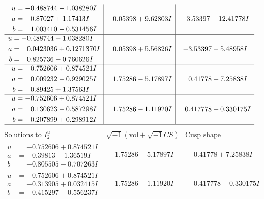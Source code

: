 \documentclass[1p]{elsarticle_modified}
\theoremstyle{definition}
\newcommand{\I}{\sqrt{-1}}
\begin{document}
$$\begin{array}{c|c|c}
\begin{aligned}
u &= -0.488744 - 1.038280 I \\
a &= \phantom{-}0.87027 + 1.17413 I \\
b &= \phantom{-}1.003410 - 0.531456 I\end{aligned}
 & \phantom{-}0.05398 + 9.62803 I & -3.53397 - 12.41778 I \\ \hline\begin{aligned}
u &= -0.488744 - 1.038280 I \\
a &= \phantom{-}0.0423036 + 0.1271370 I \\
b &= \phantom{-}0.825736 - 0.760626 I\end{aligned}
 & \phantom{-}0.05398 + 5.56826 I & -3.53397 - 5.48958 I \\ \hline\begin{aligned}
u &= -0.752606 + 0.874521 I \\
a &= \phantom{-}0.009232 - 0.929025 I \\
b &= \phantom{-}0.89425 + 1.37563 I\end{aligned}
 & \phantom{-}1.75286 - 5.17897 I & \phantom{-}0.41778 + 7.25838 I \\ \hline\begin{aligned}
u &= -0.752606 + 0.874521 I \\
a &= \phantom{-}0.130623 - 0.587298 I \\
b &= -0.207899 + 0.298912 I\end{aligned}
 & \phantom{-}1.75286 - 1.11920 I & \phantom{-}0.417778 + 0.330175 I\\
 \hline 
 \end{array}$$\newpage$$\begin{array}{c|c|c}  
\text{Solutions to }I^u_{2}& \I (\text{vol} + \sqrt{-1}CS) & \text{Cusp shape}\\
 \hline 
\begin{aligned}
u &= -0.752606 + 0.874521 I \\
a &= -0.39813 + 1.36519 I \\
b &= -0.805505 - 0.707263 I\end{aligned}
 & \phantom{-}1.75286 - 5.17897 I & \phantom{-}0.41778 + 7.25838 I \\ \hline\begin{aligned}
u &= -0.752606 + 0.874521 I \\
a &= -0.313905 + 0.032415 I \\
b &= -0.415297 - 0.556237 I\end{aligned}
 & \phantom{-}1.75286 - 1.11920 I & \phantom{-}0.417778 + 0.330175 I \\ \hline\begin{aligned}

\end{aligned}
\end{array}$$
\end{document}
